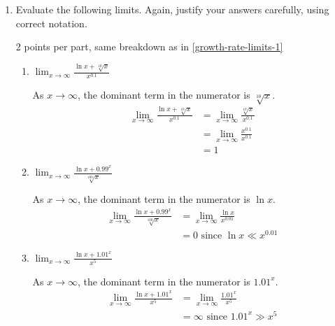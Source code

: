 \documentclass{article}
\begin{document}
\begin{enumerate}
\item Evaluate the following limits. Again, justify your answers carefully, using correct notation.

  \begin{grading}
    2 points per part, same breakdown as in \ref{growth-rate-limits-1}
  \end{grading}

  \begin{enumerate}
  \item
    \begin{problem}[\vfill]
      $\displaystyle \lim_{x \to \infty} \frac{\ln x + \sqrt[10]{x}}{x^{0.1}}$
    \end{problem}

    \begin{solution}
      As $x \to \infty$, the dominant term in the numerator is 
      $\sqrt[10]{x}$.
      \begin{align*}
        \lim_{x \to \infty} \frac{\ln x + \sqrt[10]{x}}{x^{0.1}}
        &= \lim_{x \to \infty} \frac{\sqrt[10]{x}}{x^{0.1}} \\
        &= \lim_{x \to \infty} \frac{x^{0.1}}{x^{0.1}} \\
        &= 1
      \end{align*}
    \end{solution}

  \item
    \begin{problem}[\vfill]
      $\displaystyle \lim_{x \to \infty} \frac{\ln x + 0.99^x}{\sqrt[100]{x}}$ 
    \end{problem}

    \begin{solution}
      As $x\to \infty$, the dominant term in the numerator
      is $\ln x$.
      \begin{align*}
        \lim_{x \to \infty} \frac{\ln x + 0.99^x}{\sqrt[100]{x}}
        &= \lim_{x \to \infty} \frac{\ln x}{x^{0.01}} \\
        &= 0 \text{ since $\ln x \ll x^{0.01}$}
      \end{align*}
    \end{solution}

  \item
    \begin{problem}[\vfill\newpage]
      $\displaystyle \lim_{x \to \infty} \frac{\ln x + 1.01^x}{x^5}$
    \end{problem}

    \begin{solution}
      As $x\to\infty$, the dominant term in the numerator
      is $1.01^x$.
      \begin{align*}
        \lim_{x \to \infty} \frac{\ln x + 1.01^x}{x^5}
        &= \lim_{x \to \infty} \frac{{1.01}^x}{x^5} \\
        &= \infty \text{ since $1.01^x \gg x^5$}
      \end{align*}
    \end{solution}


\end{enumerate}
\end{enumerate}
\end{document}

